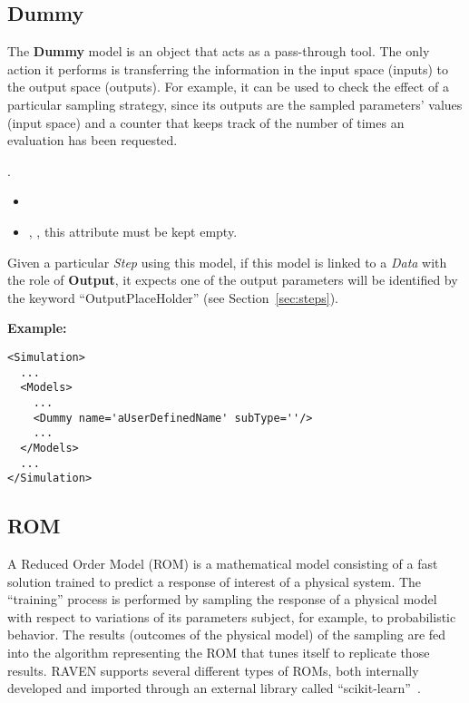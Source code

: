 \subsection{Dummy}
\label{subsec:models_dummy}
The \textbf{Dummy} model is an object that acts as a pass-through tool.
%
The only action it performs is transferring the information in the input
space (inputs) to the output space (outputs).
%
For example, it can be used to check the effect of a particular sampling
strategy, since its outputs are the sampled parameters' values (input space) and
a counter that keeps track of the number of times an evaluation has been
requested.
%

.
%
\attrsIntro
%
\vspace{-5mm}
\begin{itemize}
  \itemsep0em
  \item \nameDescription
  \item {}, , this attribute
  must be kept empty.
\end{itemize}
\vspace{-5mm}
Given a particular \textit{Step} using this model, if this model is linked to
a \textit{Data} with the role of \textbf{Output}, it expects one of the output
parameters will be identified by the keyword ``OutputPlaceHolder'' (see
Section~\ref{sec:steps}).

\textbf{Example:}
\begin{lstlisting}[style=XML,morekeywords={subType}]
<Simulation>
  ...
  <Models>
    ...
    <Dummy name='aUserDefinedName' subType=''/>
    ...
  </Models>
  ...
</Simulation>
\end{lstlisting}
\subsection{ROM}
\label{subsec:models_ROM}
A Reduced Order Model (ROM) is a mathematical model consisting of a fast
solution trained to predict a response of interest of a physical system.
%
The ``training'' process is performed by sampling the response of a physical
model with respect to variations of its parameters subject, for example, to
probabilistic behavior.
%
The results (outcomes of the physical model) of the sampling are fed into the
algorithm representing the ROM that tunes itself to replicate those results.
%
RAVEN supports several different types of ROMs, both internally developed and
imported through an external library called ``scikit-learn''~\cite{SciKitLearn}.

